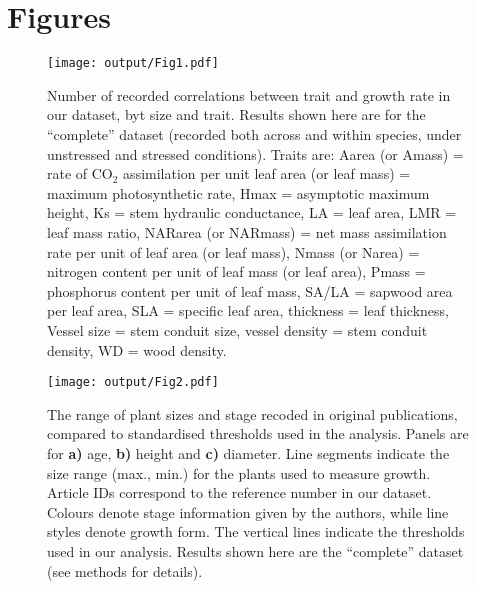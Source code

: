 \documentclass[a4paper,11pt]{article}
\begin{document}
\clearpage
\linespread{1}

\nocite{*}

\label{references}


\clearpage
\section*{Figures}

\begin{figure}[h!]
\centering
\texttt{[image: output/Fig1.pdf]}
\caption{Number of recorded correlations between trait and growth rate in our dataset, byt size and trait. Results shown here are for the ``complete'' dataset (recorded both across and within species, under unstressed and stressed conditions). Traits are: Aarea (or Amass) = rate of CO$_{2}$ assimilation per unit leaf area (or leaf mass) = maximum photosynthetic rate, Hmax = asymptotic maximum height,  Ks = stem hydraulic conductance, LA = leaf area, LMR = leaf mass ratio, NARarea (or NARmass) = net mass assimilation rate per unit of leaf area (or leaf mass), Nmass (or Narea) = nitrogen content per unit of leaf mass (or leaf area), Pmass = phosphorus content per unit of leaf mass, SA/LA = sapwood area per leaf area, SLA = specific leaf area, thickness = leaf thickness, Vessel size = stem conduit size, vessel density = stem conduit density, WD = wood density.}
\label{fig:fig1}
\end{figure}

\begin{figure}[h!]
\centering
\texttt{[image: output/Fig2.pdf]}
\caption{The range of plant sizes and stage recoded in original publications, compared to standardised thresholds used in the analysis. Panels are for
\textbf{a)} age, \textbf{b)} height and \textbf{c)} diameter. Line segments indicate the size range (max., min.) for the plants used to measure growth. Article IDs correspond to the reference number in our dataset. Colours denote stage information given by the authors, while line styles denote growth form. The vertical lines indicate the thresholds used in our analysis. Results shown here are the ``complete'' dataset (see methods for details).}
\label{fig:fig2}
\end{figure}
\end{document}
